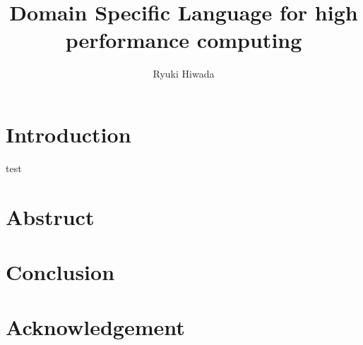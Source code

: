 \documentclass{jarticle}
\author{Ryuki Hiwada}
\title{Domain Specific Language for high performance computing}
\begin{document}
\maketitle
\section{Introduction}
test
\section{Abstruct}
\section{Conclusion}
\section{Acknowledgement}

\end{document}
